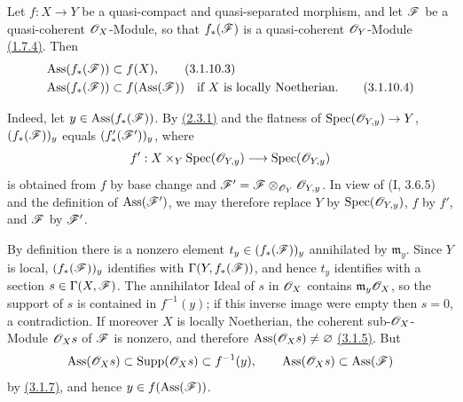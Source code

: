 \begin{remark}[3.1.10.2]
\label{IV.3.1.10.2}
Let $f:X\to Y$ be a quasi-compact and quasi-separated morphism, and let
$\mathscr{F}$ be a quasi-coherent $\mathscr{O}_X$-Module, so that $f_*(\mathscr{F})$
is a quasi-coherent $\mathscr{O}_Y$-Module {\hyperref[subsection:IV.1.7]{(1.7.4)}}.  Then
\begin{align}
 \operatorname{Ass}(f_*(\mathscr{F}))&\subset f(X), \label{IV.3.1.10.3}
\tag{3.1.10.3}\\
 \operatorname{Ass}(f_*(\mathscr{F}))&\subset f(\operatorname{Ass}(\mathscr{F}))
       \quad\text{if $X$ is locally Noetherian}. \label{IV.3.1.10.4}
\tag{3.1.10.4}
\end{align}

Indeed, let $y\in\operatorname{Ass}(f_*(\mathscr{F}))$.  By {\hyperref[IV.2.3.1]{(2.3.1)}} and the
flatness of $\operatorname{Spec}(\mathscr{O}_{Y,y})\to Y$,
$(f_*(\mathscr{F}))_y$ equals $(f'_*(\mathscr{F}'))_y$, where
\[
 f':X\times_Y\operatorname{Spec}(\mathscr{O}_{Y,y})
       \longrightarrow\operatorname{Spec}(\mathscr{O}_{Y,y})
\]
is obtained from $f$ by base change and
$\mathscr{F}'=\mathscr{F}\otimes_{\mathscr{O}_Y}\mathscr{O}_{Y,y}$.  In view of (I, 3.6.5)
and the definition of $\operatorname{Ass}(\mathscr{F}')$, we may therefore
replace $Y$ by $\operatorname{Spec}(\mathscr{O}_{Y,y})$, $f$ by $f'$, and
$\mathscr{F}$ by $\mathscr{F}'$.

By definition there is a nonzero element
$t_y\in(f_*(\mathscr{F}))_y$ annihilated by $\mathfrak m_y$.  Since $Y$ is
local, $(f_*(\mathscr{F}))_y$ identifies with
$\Gamma(Y,f_*(\mathscr{F}))$, and hence $t_y$ identifies with a section
$s\in\Gamma(X,\mathscr{F})$.  The annihilator Ideal of $s$ in $\mathscr{O}_X$
contains $\mathfrak m_y\mathscr{O}_X$, so the support of $s$ is contained in
$f^{-1}(y)$; if this inverse image were empty then $s=0$, a
contradiction.  If moreover $X$ is locally Noetherian, the coherent
sub-$\mathscr{O}_X$-Module $\mathscr{O}_Xs$ of $\mathscr{F}$ is nonzero, and therefore
$\operatorname{Ass}(\mathscr{O}_Xs)\neq\varnothing$ {\hyperref[IV.3.1.5]{(3.1.5)}}.  But
\[
 \operatorname{Ass}(\mathscr{O}_Xs)\subset\operatorname{Supp}(\mathscr{O}_Xs)
 \subset f^{-1}(y),
 \qquad
 \operatorname{Ass}(\mathscr{O}_Xs)\subset\operatorname{Ass}(\mathscr{F})
\]
by {\hyperref[IV.3.1.7]{(3.1.7)}}, and hence $y\in f(\operatorname{Ass}(\mathscr{F}))$.
\end{remark}

